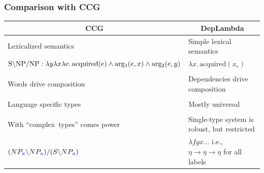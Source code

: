\documentclass[mathserif,12pt]{beamer}
\newcommand{\hlight}[1]{{\color{blue!80} #1}}
\newcommand{\lx}{\lambda x }
\renewcommand{\land}{\wedge}
\newcommand{\lspace}{.\,}
\begin{document}
\begin{frame}
\frametitle{Comparison with CCG}
\vspace{-1.5em}
\begin{center}
\begin{tabular}{p{5.6cm}|p{5.6cm}}
 \multicolumn{1}{c|}{\hlight{CCG}} & \multicolumn{1}{c}{\hlight{DepLambda}} \\
 \midrule
 Lexicalized semantics & Simple lexical semantics \\
 \scriptsize $\hbox{S} \backslash \hbox{NP}/ \hbox{NP} : \lambda y \lambda x \lambda e \lspace \mathrm{acquired}(e) \land \mathrm{arg_1}(e, x) \land \mathrm{arg_2}(e, y)$  & \scriptsize $\lx \lspace \mathrm{acquired}(x_e)$ \\ 
\\
 Words drive composition & Dependencies drive composition \\
\\
 Language specific types & Mostly universal \\
 
\pause \\
With ``complex~types'' comes power & Single-type system is robust, but restricted \\
\scriptsize $(NP_{\hlight{\bf x}}\backslash NP_\hlight{\bf x})/(S\backslash NP_{\hlight{\bf x}})$ & \small $\lambda fgx \ldots $ i.e., $\eta \rightarrow \eta \rightarrow \eta$ for all labels \\
\end{tabular}
\end{center}
\end{frame}
\end{document}
